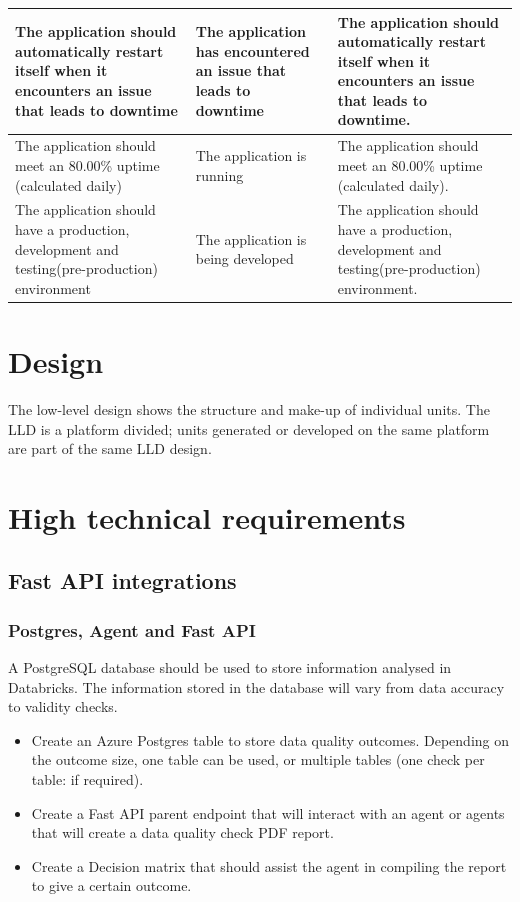 \documentclass{article}
\begin{document}
\begin{table}[h]
\begin{tabular}{|p{3cm}|p{5cm}|p{5cm}|}
        The application should automatically restart itself when it encounters an issue that leads to downtime &
        The application has encountered an issue that leads to downtime &
        The application should automatically restart itself when it encounters an issue that leads to downtime.\\
        \hline
        The application should meet an 80.00\% uptime (calculated daily) &
        The application is running &
        The application should meet an 80.00\% uptime (calculated daily).\\
        \hline
        The application should have a production, development and testing(pre-production) environment &
        The application is being developed &
        The application should have a production, development and testing(pre-production) environment.\\
        \hline
    \end{tabular}
 \end{table}

 \section{Design}
The low-level design shows the structure and make-up of individual units. The LLD is a platform divided; units generated or developed on the same platform are part of the same LLD design.\\

\section{High technical requirements}
\subsection{Fast API integrations}
\subsubsection{Postgres, Agent and Fast API}
 A PostgreSQL database should be used to store information analysed in Databricks. The information stored in the database will vary from data accuracy to validity checks.
 \begin{itemize}
     \item  Create an Azure Postgres table to store data quality outcomes. Depending on the outcome size, one table can be used, or multiple tables (one check per table: if required).
     \item  Create a Fast API parent endpoint that will interact with an agent or agents that will create a data quality check PDF report.
     \item Create a Decision matrix that should assist the agent in compiling the report to give a certain outcome.
 \end{itemize}
\end{document}
